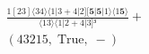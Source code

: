 \documentclass[varwidth, border=5pt]{standalone}
\begin{document}
\begin{my}
$\begin{gathered}
\scriptscriptstyle\frac{1[23]⟨34⟩⟨1|3+4|2][𝟓|𝟓|1⟩⟨1𝟓⟩}{⟨13⟩⟨1|2+4|3]³} +\\
\scriptscriptstyle(43215,\;\text{True},\;-) \phantom{+}
\end{gathered}$
\end{my}
\end{document}
